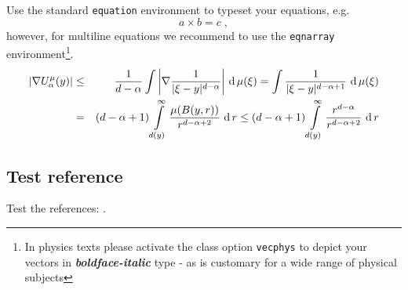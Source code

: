 Use the standard \verb|equation| environment to typeset your equations, e.g.
%
\begin{equation}
  a \times b = c\;,
\end{equation}
%
however, for multiline equations we recommend to use the \verb|eqnarray| environment\footnote{In physics texts please activate the class option \texttt{vecphys} to depict your vectors in \textbf{\itshape boldface-italic} type - as is customary for a wide range of physical subjects}.
\begin{equation} \label{eq:01}
  \begin{aligned}
    \left|\nabla U_{\alpha}^{\mu}(y)\right| &\le&\frac1{d-\alpha}\int
    \left|\nabla\frac1{|\xi-y|^{d-\alpha}}\right|\,\operatorname*{d}\mu(\xi) =
    \int \frac1{|\xi-y|^{d-\alpha+1}} \,\operatorname*{d}\mu(\xi)  \\
    &=&(d-\alpha+1) \int\limits_{d(y)}^\infty
    \frac{\mu(B(y,r))}{r^{d-\alpha+2}}\,\operatorname*{d} r \le (d-\alpha+1)
    \int\limits_{d(y)}^\infty \frac{r^{d-\alpha}}{r^{d-\alpha+2}}\,\operatorname*{d} r
  \end{aligned}
\end{equation}


\subsection*{Test reference}

Test the references: \citep{broy2022,gangolli1999,geddes1992,hamburger1995,slifka2000clinical}.

